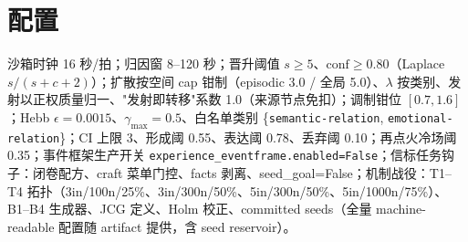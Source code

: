 \documentclass[10pt,a4paper]{ctexart}
\begin{document}
\section{配置}
沙箱时钟 16 秒/拍；归因窗 8--120 秒；晋升阈值 $s\ge5$、$\mathrm{conf}\ge0.80$（Laplace $s/(s+c+2)$）；扩散按空间 cap 钳制（episodic 3.0 / 全局 5.0）、$\lambda$ 按类别、发射以正权质量归一、"发射即转移"系数 1.0（来源节点免扣）；调制钳位 $[0.7,1.6]$；Hebb $\epsilon=0.0015$、$\gamma_{\max}=0.5$、白名单类别 \{\texttt{semantic-relation}, \texttt{emotional-relation}\}；CI 上限 3、形成阈 0.55、表达阈 0.78、丢弃阈 0.10；再点火冷场阈 0.35；事件框架生产开关 \texttt{experience\_eventframe.enabled=False}；信标任务钩子：闭卷配方、craft 菜单门控、facts 剥离、seed\_goal=False；机制战役：T1--T4 拓扑（3in/100n/25\%、3in/300n/50\%、5in/300n/50\%、5in/1000n/75\%）、B1--B4 生成器、JCG 定义、Holm 校正、committed seeds（全量 machine-readable 配置随 artifact 提供，含 seed reservoir）。
\end{document}
